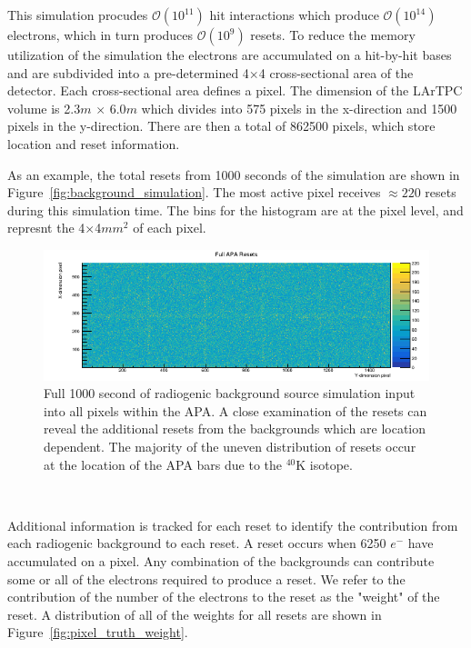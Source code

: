 This simulation procudes $\mathcal{O}(10^{11})$ hit interactions which produce $\mathcal{O}(10^{14})$ electrons, which in turn produces $\mathcal{O}(10^{9})$ resets.
To reduce the memory utilization of the simulation the electrons are accumulated on a hit-by-hit bases and are subdivided into a pre-determined 4$\times$4 cross-sectional area of the detector.
Each cross-sectional area defines a pixel.
The dimension of the LArTPC volume is 2.3$\unit{m}$ $\times$ 6.0$\unit{m}$ which divides into 575 pixels in the x-direction and 1500 pixels in the y-direction.
There are then a total of 862500 pixels, which store location and reset information.

As an example, the total resets from 1000 seconds of the simulation are shown in Figure~\ref{fig:background_simulation}.
The most active pixel receives $\approx 220$ resets during this simulation time.
The bins for the histogram are at the pixel level, and represnt the 4$\times$4$\unit{mm^{2}}$ of each pixel.

\begin{figure}[]
\centering
\includegraphics[width=\textwidth]{images/fullApaResets.png}
\caption{Full 1000 second of radiogenic background source simulation input into all pixels within the APA.
A close examination of the resets can reveal the additional resets from the backgrounds which are location dependent.
The majority of the uneven distribution of resets occur at the location of the APA bars due to the $^{40}$K isotope.
}
\end{figure}~\label{fig:background_simulation}

Additional information is tracked for each reset to identify the contribution from each radiogenic background to each reset.
A reset occurs when 6250 $e^{-}$ have accumulated on a pixel.
Any combination of the backgrounds can contribute some or all of the electrons required to produce a reset.
We refer to the contribution of the number of the electrons to the reset as the "weight" of the reset.
A distribution of all of the weights for all resets are shown in Figure~\ref{fig:pixel_truth_weight}.

